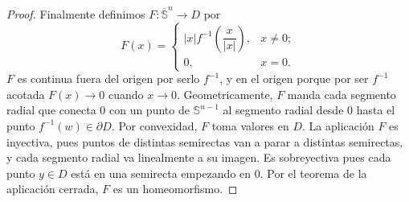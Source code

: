 \documentclass[10pt]{report}
\theoremstyle{definition}
\begin{document}
\begin{proof}
Finalmente definimos $F:\overline{\mathbb{S}}^n \to D$ por 
$$F(x)= \left\{\begin{array}{lc}
				|x|f^{-1}\left(\dfrac{x}{|x|}\right), & x\neq 0;
				\\0, & x=0.

\end{array}
\right. $$
$F$ es continua fuera del origen por serlo $f^{-1}$, y en el origen porque por ser $f^{-1}$ acotada $F(x) \to 0$ cuando $x\to 0$. Geometricamente, $F$ manda cada segmento radial que conecta 0 con un punto de $\mathbb{S}^{n-1}$ al segmento radial desde $0$ hasta el punto $f^{-1}(w)\in \partial D$. Por convexidad, $F$ toma valores en $D$. La aplicación $F$ es inyectiva, pues puntos de distintas semirectas van a parar a distintas semirectas, y cada segmento radial va linealmente a su imagen. Es sobreyectiva pues cada punto $y \in D$ está en una semirecta empezando en 0. Por el teorema de la aplicación cerrada, $F$ es un homeomorfismo.
\end{proof}
\end{document}
